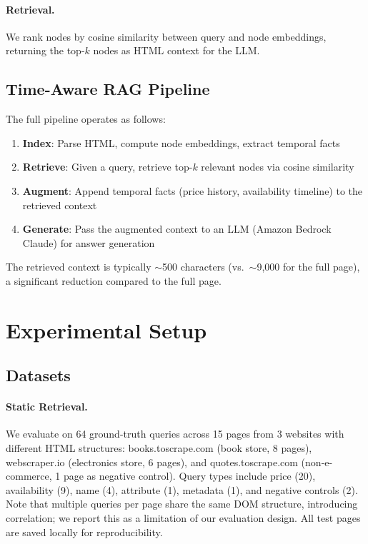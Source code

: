 \documentclass[11pt]{article}
\begin{document}
\paragraph{Retrieval.} We rank nodes by cosine similarity between query and node embeddings, returning the top-$k$ nodes as HTML context for the LLM.

\subsection{Time-Aware RAG Pipeline}

The full pipeline operates as follows:
\begin{enumerate}
    \item \textbf{Index}: Parse HTML, compute node embeddings, extract temporal facts
    \item \textbf{Retrieve}: Given a query, retrieve top-$k$ relevant nodes via cosine similarity
    \item \textbf{Augment}: Append temporal facts (price history, availability timeline) to the retrieved context
    \item \textbf{Generate}: Pass the augmented context to an LLM (Amazon Bedrock Claude) for answer generation
\end{enumerate}

The retrieved context is typically $\sim$500 characters (vs.\ $\sim$9,000 for the full page), a significant reduction compared to the full page.

\section{Experimental Setup}
\label{sec:setup}

\subsection{Datasets}

\paragraph{Static Retrieval.} We evaluate on 64 ground-truth queries across 15 pages from 3 websites with different HTML structures: books.toscrape.com (book store, 8 pages), webscraper.io (electronics store, 6 pages), and quotes.toscrape.com (non-e-commerce, 1 page as negative control). Query types include price (20), availability (9), name (4), attribute (1), metadata (1), and negative controls (2). Note that multiple queries per page share the same DOM structure, introducing correlation; we report this as a limitation of our evaluation design. All test pages are saved locally for reproducibility.
\end{document}
